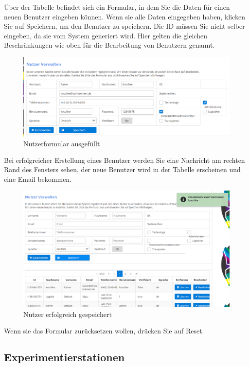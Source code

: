 \documentclass[enabledeprecatedfontcommands,fontsize=12pt,paper=a4,twoside]{scrartcl}
\begin{document}
Über der Tabelle befindet sich ein Formular, in dem Sie die Daten für einen neuen Benutzer eingeben können. Wenn sie alle Daten eingegeben haben, klicken Sie auf Speichern, um den Benutzer zu speichern. Die ID müssen Sie nicht selber eingeben, da sie vom System generiert wird. 
Hier gelten die gleichen Beschränkungen wie oben für die Bearbeitung von Benutzern genannt. 
\begin{figure}[h!]
\begin{center}
 \includegraphics[width=\textwidth]{screenshots/admin/nutzerformularausgefuellt.png}
  \caption{Nutzerformular ausgefüllt}
  \label{fig:boat3}
\end{center}
\end{figure}
Bei erfolgreicher Erstellung eines Benutzer werden Sie eine Nachricht am rechten Rand des Fensters sehen, der neue Benutzer wird in der Tabelle erscheinen und eine Email bekommen. 
\begin{figure}[h!]
\begin{center}
 \includegraphics[width=\textwidth]{screenshots/admin/nutzererfolgreich.png}
  \caption{Nutzer erfolgreich gespeichert}
  \label{fig:boat1}
\end{center}
\end{figure}
Wenn sie das Formular zurücksetzen wollen, drücken Sie auf Reset. 
\subsection{Experimentierstationen}
\end{document}
